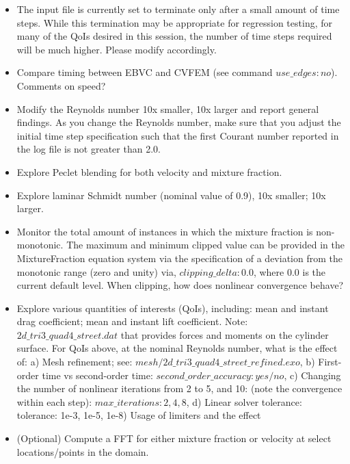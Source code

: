 \documentclass{article}
\begin{document}
\begin{itemize}
	\item The input file is currently set to terminate only after a small amount of time steps. While this
              termination may be appropriate for regression testing, for many of the QoIs desired in this
              session, the number of time steps required will be much higher. Please modify accordingly.
	\item Compare timing between EBVC and CVFEM (see command $use\_edges: no$). Comments on speed?
        \item Modify the Reynolds number 10x smaller, 10x larger and report general findings. 
          As you change the Reynolds number, make sure that you adjust the initial time step 
          specification such that the first Courant number reported in the log file is not greater 
          than 2.0.
        \item Explore Peclet blending for both velocity and mixture fraction.
        \item Explore laminar Schmidt number (nominal value of 0.9), 10x smaller; 10x larger.
        \item Monitor the total amount of instances in which the mixture fraction is non-monotonic.
          \subitem The maximum and minimum clipped value can be provided in the MixtureFraction
          equation system via the specification of a deviation from the monotonic range (zero and unity)
          via, $clipping\_delta: 0.0$, where $0.0$ is the current default level. When clipping, how does nonlinear 
          convergence behave?
        \item Explore various quantities of interests (QoIs), including: mean and instant drag 
          coefficient; mean and instant lift coefficient. 
        \subitem Note: $2d\_tri3\_quad4\_street.dat$ 
          that provides forces and moments on the cylinder surface. For QoIs above, at the nominal 
          Reynolds number, what is the effect of: a) Mesh refinement; see: 
          $mesh/2d\_tri3\_quad4\_street\_refined.exo$, b) First-order time vs second-order time: 
          $second\_order\_accuracy: yes/no$, c) Changing the number of nonlinear iterations from 2 to 5, 
          and 10: (note the convergence within each step): $max\_iterations: 2, 4, 8$, d) Linear solver 
          tolerance: tolerance: 1e-3, 1e-5, 1e-8) Usage of limiters and the effect
        \item (Optional) Compute a FFT for either mixture fraction or velocity at select locations/points in the domain. 
\end{itemize}
\end{document}
